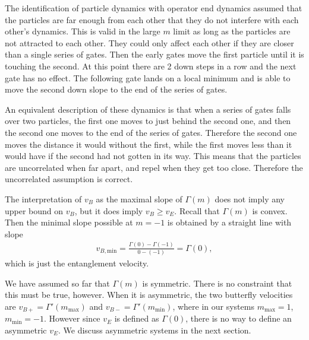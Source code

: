 The identification of particle dynamics with operator end dynamics assumed that the particles are far enough from each other that they do not interfere with each other's dynamics. This is valid in the large $m$ limit as long as the particles are not attracted to each other. They could only affect each other if they are closer than a single series of gates. Then the early gates move the first particle until it is touching the second. At this point there are 2 down steps in a row and the next gate has no effect. The following gate lands on a local minimum and is able to move the second down slope to the end of the series of gates.

An equivalent description of these dynamics is that when a series of gates falls over two particles, the first one moves to just behind the second one, and then the second one moves to the end of the series of gates. Therefore the second one moves the distance it would without the first, while the first moves less than it would have if the second had not gotten in its way. This means that the particles are uncorrelated when far apart, and repel when they get too close. Therefore the uncorrelated assumption is correct. 

The interpretation of $v_B$ as the maximal slope of $\Gamma(m)$ does not imply any upper bound on $v_B$, but it does imply $v_B\ge v_E$. Recall that $\Gamma(m)$ is convex. Then the minimal slope possible at $m=-1$ is obtained by a straight line with slope
\begin{align}
v_{B,\text{min}} = \frac{\Gamma(0)-\Gamma(-1)}{0-(-1)}=\Gamma(0),
\end{align}
which is just the entanglement velocity.

We have assumed so far that $\Gamma(m)$ is symmetric. There is no constraint that this must be true, however. When it is asymmetric, the two butterfly velocities are $v_{B+} = \Gamma'(m_\text{max})$ and $v_{B-} = \Gamma'(m_\text{min})$, where in our systems $m_\text{max}=1$, $m_\text{min}= -1$. However since $v_E$ is defined as $\Gamma(0)$, there is no way to define an asymmetric $v_E$. We discuss asymmetric systems in the next section. 